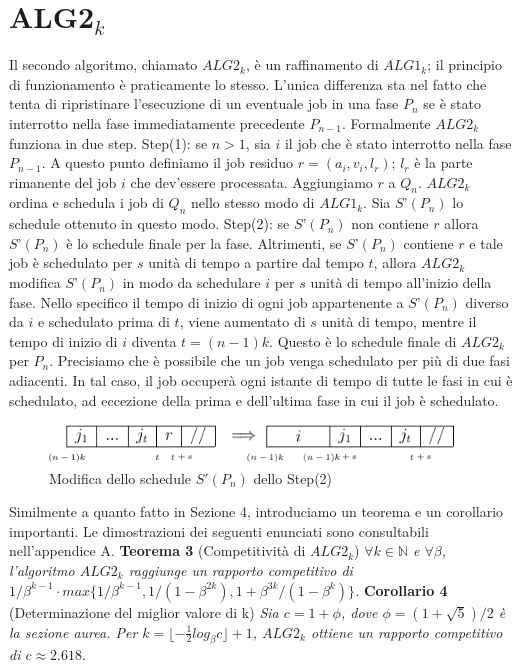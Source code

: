 \documentclass[twoside,openany,titlepage,fleqn,
	headinclude,12pt,a4paper,BCOR5mm,footinclude]{scrbook}
\newcommand*{\N}{\mathbb{N}}
\begin{document}
\section{ALG2$_{k}$}
Il secondo algoritmo, chiamato $ALG2_{k}$, è un raffinamento di $ALG1_{k}$; il principio di funzionamento è praticamente lo stesso. L’unica differenza sta nel fatto che tenta di ripristinare l’esecuzione di un eventuale job in una fase $P_{n}$ se è stato interrotto nella fase immediatamente precedente $P_{n-1}$. Formalmente $ALG2_{k}$ funziona in due step. \newline
Step(1): se $n > 1$, sia $i$ il job che è stato interrotto nella fase $P_{n-1}$. A questo punto definiamo il job residuo $r = (a_{i}, v_{i}, l_{r})$; $l_{r}$ è la parte rimanente del job $i$ che dev’essere processata. Aggiungiamo $r$ a $Q_{n}$. $ALG2_{k}$ ordina e schedula i job di $Q_{n}$ nello stesso modo di $ALG1_{k}$. Sia $S’(P_{n})$ lo schedule ottenuto in questo modo. \newline
Step(2): se $S’(P_{n})$ non contiene $r$ allora $S’(P_{n})$ è lo schedule finale per la fase. Altrimenti, se $S’(P_{n})$ contiene $r$ e tale job è schedulato per $s$ unità di tempo a partire dal tempo $t$, allora $ALG2_{k}$ modifica $S’(P_{n})$ in modo da schedulare $i$ per $s$ unità di tempo all’inizio della fase. Nello specifico il tempo di inizio di ogni job appartenente a $S’(P_{n})$ diverso da $i$ e schedulato prima di $t$, viene aumentato di $s$ unità di tempo, mentre il tempo di inizio di $i$ diventa $t = (n-1)k$. Questo è lo schedule finale di $ALG2_{k}$ per $P_{n}$. Precisiamo che è possibile che un job venga schedulato per più di due fasi adiacenti. In tal caso, il job occuperà ogni istante di tempo di tutte le fasi in cui è schedulato, ad eccezione della prima e dell'ultima fase in cui il job è schedulato. 
\renewcommand{\thefigure}{\thesection.\arabic{figure}}
\begin{figure}[H]
\caption{Modifica dello schedule $S'(P{_{n}})$ dello Step(2)}
\centering
\includegraphics[scale=1]{tab.png}
\end{figure}
\renewcommand{\thefigure}{\thesection.\arabic{figure}}

Similmente a quanto fatto in Sezione 4, introduciamo un teorema e un corollario importanti. Le dimostrazioni dei seguenti enunciati sono consultabili nell'appendice A.
\newline\newline
\textbf{Teorema 3} (Competitività di $ALG2_{k}$)
\textit{$\forall k \in \N$ e $\forall \beta$, l'algoritmo $ALG2_{k}$ raggiunge un rapporto competitivo di $1 / \beta^{k - 1} \cdot max \{1 / \beta^{k - 1}, 1 / (1 - \beta^{2k}), 1 + \beta^{3k} / (1 - \beta^{k})\}$.}
\newline\newline
\textbf{Corollario 4} (Determinazione del miglior valore di k)
\textit{Sia $c = 1 + \phi$, dove $\phi = (1 + \sqrt{5}) / 2$ è la sezione aurea. Per $k = \lfloor -\frac{1}{2} log_{\beta} c \rfloor + 1$, $ALG2_{k}$ ottiene un rapporto competitivo di $c \approx 2.618.$}
\end{document}
